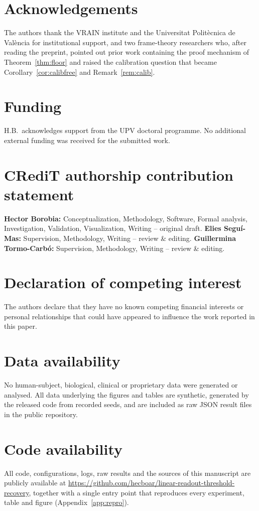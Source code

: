 \documentclass[preprint,12pt]{elsarticle}
\theoremstyle{definition}
\begin{document}
\section*{Acknowledgements}
The authors thank the VRAIN institute and the Universitat Polit\`ecnica de Val\`encia for
institutional support, and two frame-theory researchers who, after reading the preprint,
pointed out prior work containing the proof mechanism of Theorem~\ref{thm:floor} and raised the
calibration question that became Corollary~\ref{cor:calibfree} and Remark~\ref{rem:calib}.

\section*{Funding}
H.B.\ acknowledges support from the UPV doctoral programme. No additional external funding was
received for the submitted work.

\section*{CRediT authorship contribution statement}
\textbf{Hector Borobia:} Conceptualization, Methodology, Software, Formal analysis,
Investigation, Validation, Visualization, Writing -- original draft.
\textbf{Elies Segu\'i-Mas:} Supervision, Methodology, Writing -- review \& editing.
\textbf{Guillermina Tormo-Carb\'o:} Supervision, Methodology, Writing -- review \& editing.

\section*{Declaration of competing interest}
The authors declare that they have no known competing financial interests or personal
relationships that could have appeared to influence the work reported in this paper.

\section*{Data availability}
No human-subject, biological, clinical or proprietary data were generated or analysed. All
data underlying the figures and tables are synthetic, generated by the released code from
recorded seeds, and are included as raw JSON result files in the public repository.

\section*{Code availability}
All code, configurations, logs, raw results and the sources of this manuscript are publicly
available at \url{https://github.com/hecboar/linear-readout-threshold-recovery}, together with
a single entry point that reproduces every experiment, table and figure
(Appendix~\ref{app:repro}).
\end{document}
